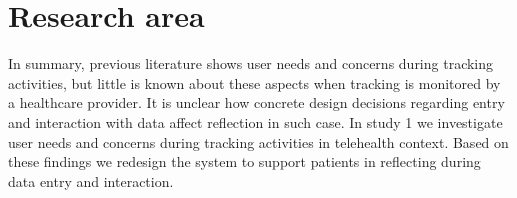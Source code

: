 \section{Research area}

In summary, previous literature shows user needs and concerns during tracking activities, but little is known about these aspects when tracking is monitored by a healthcare provider. It is unclear how concrete design decisions regarding entry and interaction with data affect reflection in such case. In study 1 we investigate user needs and concerns during tracking activities in telehealth context. Based on these findings we redesign the system to support patients in reflecting during data entry and interaction. 
